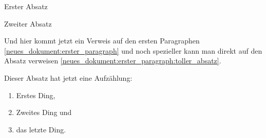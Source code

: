 
\stupadate{} %
\publishdate{} %
\jurchanges{
}


\begin{jurdoc}

\label{neues_dokument:erster_paragraph}
Erster Absatz

Zweiter Absatz\label{neues_dokument:erster_paragraph:toller_absatz}


\label{neues_dokument:anderer_paragraph}
Und hier kommt jetzt ein Verweis auf den ersten Paragraphen \ref{neues_dokument:erster_paragraph} und noch spezieller kann man direkt auf den Absatz verweisen \ref{neues_dokument:erster_paragraph:toller_absatz}.

Dieser Absatz hat jetzt eine Aufzählung:
\begin{enumerate}
	\item Erstes Ding,
	\item Zweites Ding und
	\item das letzte Ding.
\end{enumerate}



\end{jurdoc}
